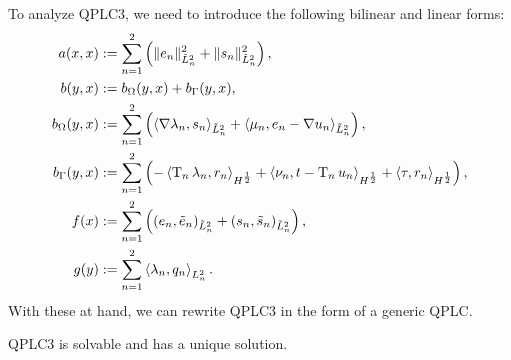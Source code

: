 To analyze QPLC3, we need to introduce the following bilinear and linear forms:
\begin{align}
    a(x,x)    & := \sum_{n=1}^2 \left( \|e_n\|^2_{\tilde{L}^2_n} + \|s_n\|^2_{\tilde{L}^2_n} \right), \\
    b(y,x)    & :=  b_\Omega(y, x) + b_\Gamma(y, x), \\
    b_\Omega(y,x) &:= \sum_{n=1}^2 \left( \left\langle \nabla \lambda_n, s_n\right\rangle_{\tilde{L}^2_n} + \left\langle \mu_n, e_n-\nabla u_n\right\rangle_{\tilde{L}^2_n}\right),\\
    b_\Gamma(y,x) &:= \sum_{n=1}^2 \left(- \left\langle \operatorname{T}_n \lambda_n, r_n\right\rangle_{H^\frac12} + \left\langle \nu_n, t - \operatorname{T}_n u_n \right\rangle_{H^\frac12} + \left\langle \tau, r_n\right\rangle_{H^\frac12}\right),\\
    f(x)   & := \sum_{n=1}^2 \left(\left( e_n , \tilde{e}_n \right)_{\tilde{L}^2_n} + \left( s_n , \tilde{s}_n \right)_{\tilde{L}^2_n} \right), \\
    g(y)   & := \sum_{n=1}^2 \left\langle \lambda_n , q_n \right\rangle_{L^2_n}.
\end{align}
With these at hand, we can rewrite QPLC3 in the form of a generic QPLC.

\begin{proposition}
QPLC3 is solvable and has a unique solution.
\end{proposition}

